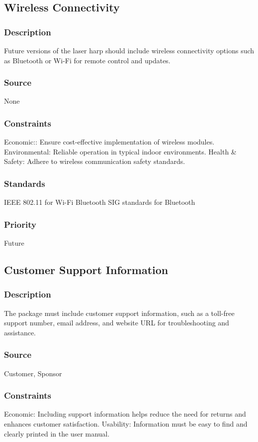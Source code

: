 \subsection{Wireless Connectivity}
\subsubsection{Description}
Future versions of the laser harp should include wireless connectivity options such as Bluetooth or Wi-Fi for remote control and updates.
\subsubsection{Source}
None
\subsubsection{Constraints}
Economic:: Ensure cost-effective implementation of wireless modules.
Environmental: Reliable operation in typical indoor environments.
Health & Safety: Adhere to wireless communication safety standards.
\subsubsection{Standards}
IEEE 802.11 for Wi-Fi
Bluetooth SIG standards for Bluetooth
\subsubsection{Priority}
Future


\subsection{Customer Support Information}
\subsubsection{Description}
The package must include customer support information, such as a toll-free support number, email address, and website URL for troubleshooting and assistance.
\subsubsection{Source}
Customer, Sponsor
\subsubsection{Constraints}
Economic: Including support information helps reduce the need for returns and enhances customer satisfaction.
Usability: Information must be easy to find and clearly printed in the user manual.

